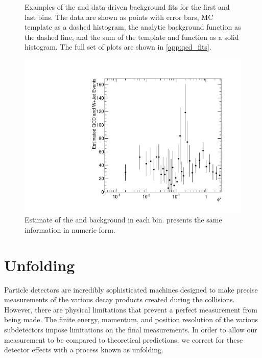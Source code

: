 \begin{figure}[!htbp]
\begin{subfigure}[b]{\SideBySidePlotWidth}
        \caption{}
        \label{fig:qcd_fit_example_34}
    \end{subfigure}
    \caption[
       Examples of the \QCDjets and \wjets data-driven background fits.
    ]{
       Examples of the \QCDjets and \wjets data-driven background fits for the
       first and last \phistar bins. The data are shown as points with error
       bars, MC template as a dashed histogram, the analytic background
       function as the dashed line, and the sum of the template and function as
       a solid histogram. The full set of plots are shown in
       \cref{app:qcd_fits}.
    }
    \label{fig:qcd_example_fits}
\end{figure}

\begin{figure}[!htbp]
    \centering
    \includegraphics[width=\textwidth]{figures/qcd_phistar.pdf}
    \caption[
        Estimate of the \QCDjets and \wjets background in each \phistar bin.
    ]{
        Estimate of the \QCDjets and \wjets background in each \phistar bin.
         presents the same information in numeric
        form.
    }
    \label{fig:qcd_phistar}
\end{figure}

\section{Unfolding}
\label{sec:unfolding}

Particle detectors are incredibly sophisticated machines designed to make
precise measurements of the various decay products created during the
collisions. However, there are physical limitations that prevent a perfect
measurement from being made. The finite energy, momentum, and position
resolution of the various subdetectors impose limitations on the final
measurements. In order to allow our measurement to be compared to theoretical
predictions, we correct for these detector effects with a process known as
unfolding.

